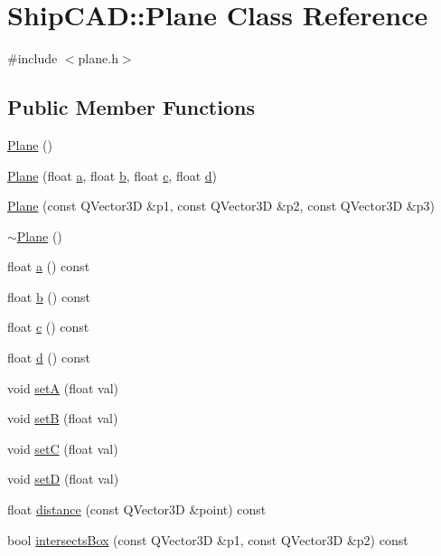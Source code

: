 \hypertarget{classShipCAD_1_1Plane}{\section{Ship\-C\-A\-D\-:\-:Plane Class Reference}
\label{classShipCAD_1_1Plane}
}


{\ttfamily \#include $<$plane.\-h$>$}

\subsection*{Public Member Functions}
\begin{DoxyCompactItemize}
\item 
\hyperlink{classShipCAD_1_1Plane_acac0d9c003e0ab10d07b146c3566a0c7}{Plane} ()
\item 
\hyperlink{classShipCAD_1_1Plane_a9a1420228e8baa632c7e8ba66f27772f}{Plane} (float \hyperlink{classShipCAD_1_1Plane_a1105f3715d9593c0971e0b0959859a84}{a}, float \hyperlink{classShipCAD_1_1Plane_adf79c9ba86dd3112fc098141195fcac5}{b}, float \hyperlink{classShipCAD_1_1Plane_a01b0067ca1a669aef5a8ab85bfce41cc}{c}, float \hyperlink{classShipCAD_1_1Plane_a7755d7967aae2e083c5d08fed49d9eef}{d})
\item 
\hyperlink{classShipCAD_1_1Plane_adbaa1f5c7100e5592312359cb8eede37}{Plane} (const Q\-Vector3\-D \&p1, const Q\-Vector3\-D \&p2, const Q\-Vector3\-D \&p3)
\item 
\hyperlink{classShipCAD_1_1Plane_aff2204f8b2b25c201d172d4ec2518c77}{$\sim$\-Plane} ()
\item 
float \hyperlink{classShipCAD_1_1Plane_a1105f3715d9593c0971e0b0959859a84}{a} () const 
\item 
float \hyperlink{classShipCAD_1_1Plane_adf79c9ba86dd3112fc098141195fcac5}{b} () const 
\item 
float \hyperlink{classShipCAD_1_1Plane_a01b0067ca1a669aef5a8ab85bfce41cc}{c} () const 
\item 
float \hyperlink{classShipCAD_1_1Plane_a7755d7967aae2e083c5d08fed49d9eef}{d} () const 
\item 
void \hyperlink{classShipCAD_1_1Plane_a383a2f49031b8bcfa04be06035836a05}{set\-A} (float val)
\item 
void \hyperlink{classShipCAD_1_1Plane_aab7d46cba75a32089644b183e0a82dff}{set\-B} (float val)
\item 
void \hyperlink{classShipCAD_1_1Plane_affed6efd889f4725ae764b243763fb3e}{set\-C} (float val)
\item 
void \hyperlink{classShipCAD_1_1Plane_a5c3e18bcb1bb77563fd994866ba823df}{set\-D} (float val)
\item 
float \hyperlink{classShipCAD_1_1Plane_a6851b997a300848fcb37b33407165c44}{distance} (const Q\-Vector3\-D \&point) const 
\item 
bool \hyperlink{classShipCAD_1_1Plane_a76d5f22d213962e8ab0880fae3e919df}{intersects\-Box} (const Q\-Vector3\-D \&p1, const Q\-Vector3\-D \&p2) const 
\end{DoxyCompactItemize}


